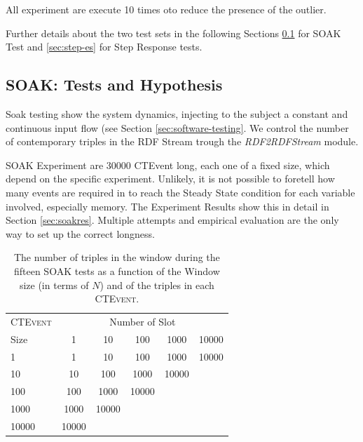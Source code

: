 All experiment are execute 10 times oto reduce the presence of the outlier.

Further details about the two test sets in the following Sections \ref{sec:soak-es} for SOAK Test and \ref{sec:step-es} for Step Response tests.

\subsection{SOAK: Tests and Hypothesis}\label{sec:soak-es}

Soak testing show the system dynamics, injecting to the subject a constant and continuous input flow (see Section \ref{sec:software-testing}.  We control the number of contemporary triples in the RDF Stream trough the \textit{RDF2RDFStream} module. %

SOAK Experiment are 30000 CTEvent long, each one of a fixed size, which depend on the specific experiment. Unlikely, it is not possible to foretell how many events are required in to reach the Steady State condition for each variable involved, especially memory. The Experiment Results show this in detail in Section \ref{sec:soakres}. Multiple attempts and empirical evaluation are the only way to set up the correct longness.

\begin{table}[htb]
\centering
\normalsize
 \begin{tabular}{l| ccccc}
	  	\hline
		\textsc{CTEvent}  &\multicolumn{5}{c}{Number of Slot}  \\
		Size  & 1 & 10 & 100 & 1000&10000 \\
		\hline	
		1 & 1& 10 & 100 & 1000&10000 \\
		10  & 10 & 100 & 1000&10000 \\
		100 & 100&1000&10000  \\
		1000 &1000 & 10000 \\
		10000&10000  \\
		\hline 
	\end{tabular}
	
	 \vspace{10pt}
	\caption{The number of triples in the window during the fifteen SOAK tests as a function of the Window size (in terms of $N$) and of the triples in each \textsc{CTEvent}.}
	\label{tab:soaktests}
\end{table}


